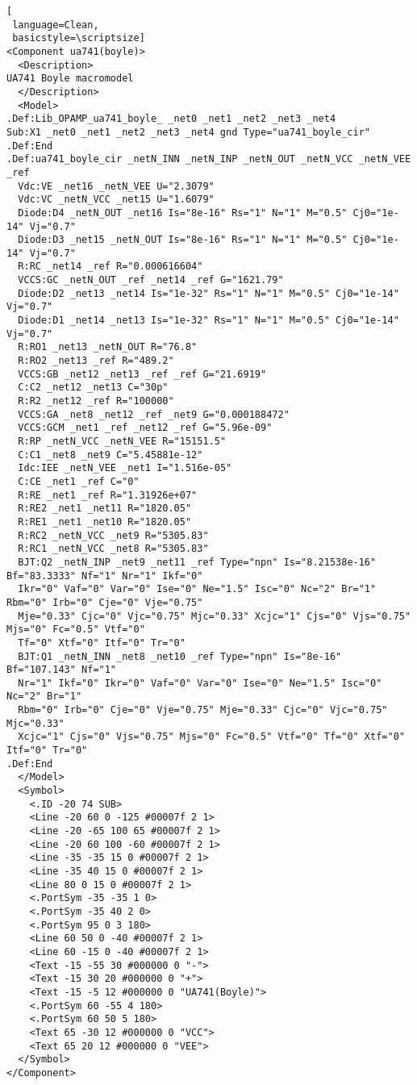 \begin{lstlisting}[
 language=Clean, 
 basicstyle=\scriptsize]
<Component ua741(boyle)>
  <Description>
UA741 Boyle macromodel
  </Description>
  <Model>
.Def:Lib_OPAMP_ua741_boyle_ _net0 _net1 _net2 _net3 _net4
Sub:X1 _net0 _net1 _net2 _net3 _net4 gnd Type="ua741_boyle_cir"
.Def:End
.Def:ua741_boyle_cir _netN_INN _netN_INP _netN_OUT _netN_VCC _netN_VEE _ref
  Vdc:VE _net16 _netN_VEE U="2.3079"
  Vdc:VC _netN_VCC _net15 U="1.6079"
  Diode:D4 _netN_OUT _net16 Is="8e-16" Rs="1" N="1" M="0.5" Cj0="1e-14" Vj="0.7"
  Diode:D3 _net15 _netN_OUT Is="8e-16" Rs="1" N="1" M="0.5" Cj0="1e-14" Vj="0.7"
  R:RC _net14 _ref R="0.000616604"
  VCCS:GC _netN_OUT _ref _net14 _ref G="1621.79"
  Diode:D2 _net13 _net14 Is="1e-32" Rs="1" N="1" M="0.5" Cj0="1e-14" Vj="0.7"
  Diode:D1 _net14 _net13 Is="1e-32" Rs="1" N="1" M="0.5" Cj0="1e-14" Vj="0.7"
  R:RO1 _net13 _netN_OUT R="76.8"
  R:RO2 _net13 _ref R="489.2"
  VCCS:GB _net12 _net13 _ref _ref G="21.6919"
  C:C2 _net12 _net13 C="30p"
  R:R2 _net12 _ref R="100000"
  VCCS:GA _net8 _net12 _ref _net9 G="0.000188472"
  VCCS:GCM _net1 _ref _net12 _ref G="5.96e-09"
  R:RP _netN_VCC _netN_VEE R="15151.5"
  C:C1 _net8 _net9 C="5.45881e-12"
  Idc:IEE _netN_VEE _net1 I="1.516e-05"
  C:CE _net1 _ref C="0"
  R:RE _net1 _ref R="1.31926e+07"
  R:RE2 _net1 _net11 R="1820.05"
  R:RE1 _net1 _net10 R="1820.05"
  R:RC2 _netN_VCC _net9 R="5305.83"
  R:RC1 _netN_VCC _net8 R="5305.83"
  BJT:Q2 _netN_INP _net9 _net11 _ref Type="npn" Is="8.21538e-16" Bf="83.3333" Nf="1" Nr="1" Ikf="0" 
  Ikr="0" Vaf="0" Var="0" Ise="0" Ne="1.5" Isc="0" Nc="2" Br="1" Rbm="0" Irb="0" Cje="0" Vje="0.75" 
  Mje="0.33" Cjc="0" Vjc="0.75" Mjc="0.33" Xcjc="1" Cjs="0" Vjs="0.75" Mjs="0" Fc="0.5" Vtf="0" 
  Tf="0" Xtf="0" Itf="0" Tr="0"
  BJT:Q1 _netN_INN _net8 _net10 _ref Type="npn" Is="8e-16" Bf="107.143" Nf="1" 
  Nr="1" Ikf="0" Ikr="0" Vaf="0" Var="0" Ise="0" Ne="1.5" Isc="0" Nc="2" Br="1" 
  Rbm="0" Irb="0" Cje="0" Vje="0.75" Mje="0.33" Cjc="0" Vjc="0.75" Mjc="0.33" 
  Xcjc="1" Cjs="0" Vjs="0.75" Mjs="0" Fc="0.5" Vtf="0" Tf="0" Xtf="0" Itf="0" Tr="0"
.Def:End
  </Model>
  <Symbol>
    <.ID -20 74 SUB>
    <Line -20 60 0 -125 #00007f 2 1>
    <Line -20 -65 100 65 #00007f 2 1>
    <Line -20 60 100 -60 #00007f 2 1>
    <Line -35 -35 15 0 #00007f 2 1>
    <Line -35 40 15 0 #00007f 2 1>
    <Line 80 0 15 0 #00007f 2 1>
    <.PortSym -35 -35 1 0>
    <.PortSym -35 40 2 0>
    <.PortSym 95 0 3 180>
    <Line 60 50 0 -40 #00007f 2 1>
    <Line 60 -15 0 -40 #00007f 2 1>
    <Text -15 -55 30 #000000 0 "-">
    <Text -15 30 20 #000000 0 "+">
    <Text -15 -5 12 #000000 0 "UA741(Boyle)">
    <.PortSym 60 -55 4 180>
    <.PortSym 60 50 5 180>
    <Text 65 -30 12 #000000 0 "VCC">
    <Text 65 20 12 #000000 0 "VEE">
  </Symbol>
</Component>
\end{lstlisting}

